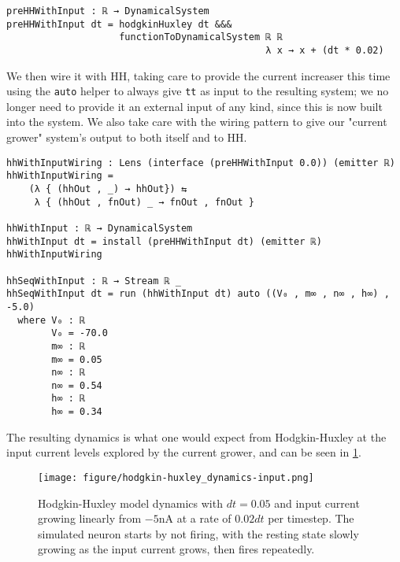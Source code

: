 \begin{verbatim}
preHHWithInput : ℝ → DynamicalSystem
preHHWithInput dt = hodgkinHuxley dt &&& 
                    functionToDynamicalSystem ℝ ℝ 
                                              λ x → x + (dt * 0.02)
\end{verbatim}
We then wire it with HH, taking care to provide the current increaser this time using the \texttt{auto} helper to always give \texttt{tt} as input to the resulting system; we no longer need to provide it an external input of any kind, since this is now built into the system. We also take care with the wiring pattern to give our "current grower" system's output to both itself and to HH. 

\begin{verbatim}
hhWithInputWiring : Lens (interface (preHHWithInput 0.0)) (emitter ℝ)
hhWithInputWiring = 
    (λ { (hhOut , _) → hhOut}) ⇆ 
     λ { (hhOut , fnOut) _ → fnOut , fnOut }

hhWithInput : ℝ → DynamicalSystem
hhWithInput dt = install (preHHWithInput dt) (emitter ℝ) hhWithInputWiring

hhSeqWithInput : ℝ → Stream ℝ _
hhSeqWithInput dt = run (hhWithInput dt) auto ((V₀ , m∞ , n∞ , h∞) , -5.0)
  where V₀ : ℝ
        V₀ = -70.0
        m∞ : ℝ
        m∞ = 0.05
        n∞ : ℝ
        n∞ = 0.54
        h∞ : ℝ
        h∞ = 0.34
\end{verbatim}

The resulting dynamics is what one would expect from Hodgkin-Huxley at the input current levels explored by the current grower, and can be seen in \ref{fig:hhdynamicsinput}.

\begin{figure}
    \centering
    \texttt{[image: figure/hodgkin-huxley\_dynamics-input.png]}
    \caption{Hodgkin-Huxley model dynamics with $dt = 0.05$ and input current growing linearly from $-5$nA at a rate of $0.02dt$ per timestep. The simulated neuron starts by not firing, with the resting state slowly growing as the input current grows, then fires repeatedly.}
    \label{fig:hhdynamicsinput}
\end{figure}

